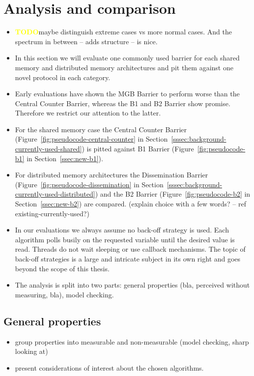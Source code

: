 \documentclass[a4paper, 10pt]{article}
\def \todo{\textbf{\textcolor{yellow}{TODO}}}
\begin{document}
\section{Analysis and comparison}
\label{sec:analysis}
\begin{itemize}
	\item \todo maybe distinguish extreme cases vs more normal cases. And the spectrum in between -- adds structure -- is nice.
	\item In this section we will evaluate one commonly used barrier for each shared memory and distributed memory architectures and pit them against one novel protocol in each category.
	\item Early evaluations have shown the MGB Barrier to perform worse than the Central Counter Barrier, whereas the B1 and B2 Barrier show promise. Therefore we restrict our attention to the latter.
	\item For the shared memory case the Central Counter Barrier (Figure~\ref{fig:pseudocode-central-counter} in Section~\ref{sssec:background-currently-used-shared}) is pitted against B1 Barrier (Figure~\ref{fig:pseudocode-b1} in Section~\ref{ssec:new-b1}).
	\item For distributed memory architectures the Dissemination Barrier (Figure~\ref{fig:pseudocode-dissemination} in Section~\ref{sssec:background-currently-used-distributed}) and the B2 Barrier (Figure~\ref{fig:pseudocode-b2} in Section~\ref{ssec:new-b2}) are compared. (explain choice with a few words? -- ref existing-currently-used?)
	\item In our evaluations we always assume no back-off strategy is used. Each algorithm polls busily on the requested variable until the desired value is read. Threads do not wait sleeping or use callback mechanisms. The topic of back-off strategies is a large and intricate subject in its own right and goes beyond the scope of this thesis.
	\item The analysis is split into two parts: general properties (bla, perceived without measuring, bla), model checking.
\end{itemize}

\subsection{General properties}
\label{ssec:analysis-general}
\begin{itemize}
	\item group properties into measurable and non-measurable (model checking, sharp looking at)
	\item present considerations of interest about the chosen algorithms.
\end{itemize}
\end{document}
